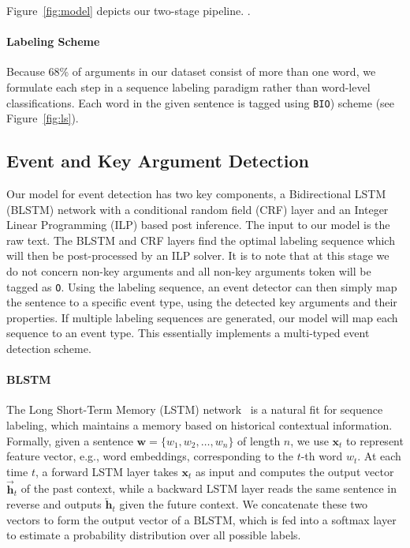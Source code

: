 Figure~\ref{fig:model} depicts our two-stage pipeline. .

\paragraph{Labeling Scheme}
Because 68\%  of  arguments in our dataset consist of more than one word, we formulate each step in a sequence labeling paradigm rather
than word-level classifications. Each word in the given sentence is tagged using \texttt{BIO}) scheme (see Figure~\ref{fig:ls}).

\subsection{Event and Key Argument Detection \label{evede}}


Our model for event detection has two key components, a Bidirectional LSTM (BLSTM) network with a conditional random field (CRF) layer and
an Integer Linear Programming (ILP) based post inference. The input to our model is the raw text. The BLSTM and CRF layers find the optimal
labeling sequence which will then be post-processed by an ILP solver. It is to note that at this stage we do not concern non-key arguments
and all non-key arguments token will be tagged as \texttt{O}.  Using the labeling sequence, an event detector can then simply map the
sentence to a specific event type, using the detected key arguments and their properties. If multiple labeling sequences are generated, our
model will map each sequence to an event type. This essentially implements a multi-typed event detection scheme.

\paragraph{BLSTM}
The Long Short-Term Memory (LSTM) network~\cite{hochreiter1997long} is a natural fit for sequence labeling, which maintains a memory based
on historical contextual information. Formally, given a sentence $\bm{w} = \{w_1, w_2, \dots, w_n\}$ of length $n$, we use $\textbf{x}_t$
to represent feature vector, e.g., word embeddings, corresponding to the $t$-th word $w_t$. At each time $t$, a forward LSTM layer takes
$\textbf{x}_t$ as input and computes the output vector $\overrightarrow{\textbf{h}}_t$ of the past context, while a backward LSTM layer
reads the same sentence in reverse and outputs $\overleftarrow{\textbf{h}}_t$ given the future context. We concatenate these two vectors to
form the output vector of a BLSTM, which is fed into a softmax layer to estimate a probability distribution over all possible labels.

